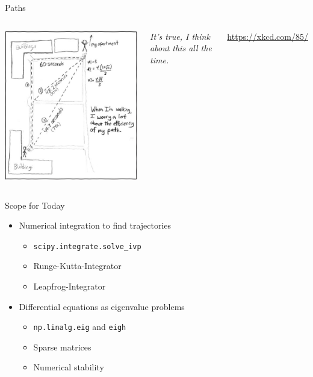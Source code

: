 
\begin{frame}[t,plain]
\titlepage
\end{frame}


\begin{frame}{Paths}
%
\begin{columns}
\begin{center}
\includegraphics[width=0.6\linewidth]{./gfx/04-xkcd-paths}\\
\end{center}
%
\small
	\emph{It's true, I think about this all the time.}

	\vspace{6pt}
	\url{https://xkcd.com/85/}
\end{columns}
%
\end{frame}


\begin{frame}{Scope for Today}
%
\begin{itemize}
\item Numerical integration to find trajectories
	\begin{itemize}
	\item \texttt{scipy.integrate.solve\_ivp}
	\item Runge-Kutta-Integrator
	\item Leapfrog-Integrator
	\end{itemize}
\item Differential equations as eigenvalue problems
	\begin{itemize}
	\item \texttt{np.linalg.eig} and \texttt{eigh}
	\item Sparse matrices
	\item Numerical stability
	\end{itemize}
\end{itemize}
%
\end{frame}


